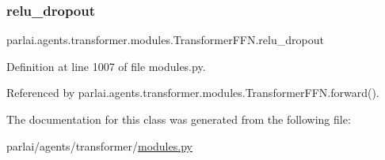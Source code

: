 \mbox{\label{classparlai_1_1agents_1_1transformer_1_1modules_1_1TransformerFFN_a22f7891e6b991a8ee6b58f08c12cf4ae}} 
\subsubsection{\texorpdfstring{relu\+\_\+dropout}{relu\_dropout}}
{\footnotesize\ttfamily parlai.\+agents.\+transformer.\+modules.\+Transformer\+F\+F\+N.\+relu\+\_\+dropout}



Definition at line 1007 of file modules.\+py.



Referenced by parlai.\+agents.\+transformer.\+modules.\+Transformer\+F\+F\+N.\+forward().



The documentation for this class was generated from the following file\+:\begin{DoxyCompactItemize}
\item 
parlai/agents/transformer/\hyperlink{parlai_2agents_2transformer_2modules_8py}{modules.\+py}\end{DoxyCompactItemize}
